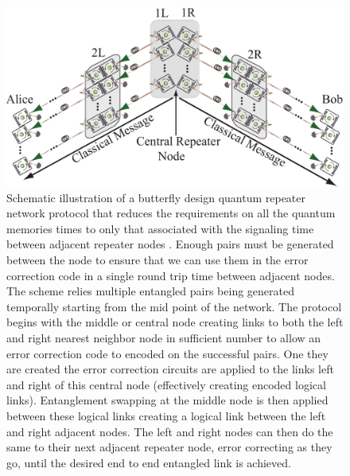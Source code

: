 \documentclass[twocolumn, aps, rmp, amsmath, amssymb, nofootinbib, superscriptaddress, longbibliography, floatfix, table-of-contents, eqsecnum]{revtex4-1}
\newcommand{\comment}[1]{{\color{blue}{\textbf{#1}}}}
\begin{document}
\begin{figure}[!htb]
\includegraphics[width=\textwidth]{repeaters_8}
\caption{\comment{Redo fig} Schematic illustration of a butterfly design quantum repeater network protocol that reduces the requirements on all the quantum memories times  to only that associated with the signaling time between adjacent repeater nodes \cite{munro10}. Enough pairs must be generated between the node to ensure that we can use them in the error correction code in a single round trip time between adjacent nodes. The scheme relies multiple entangled pairs being generated temporally starting from the mid point of the network. The protocol begins with the middle or central node creating links to both the left and right nearest neighbor node in sufficient number to allow an error correction code to encoded on the successful pairs. One they are created the error correction circuits are applied to the links left and right of this central node (effectively creating encoded logical links). Entanglement swapping at the middle node is then applied  between these logical links creating a logical link between the left and right adjacent nodes. The left and right nodes can then do the same to their next adjacent repeater node, error correcting as they go, until the desired end to end entangled link is achieved.  }
\label{fig:repeaters_8}
\end{figure} 
\end{document}

